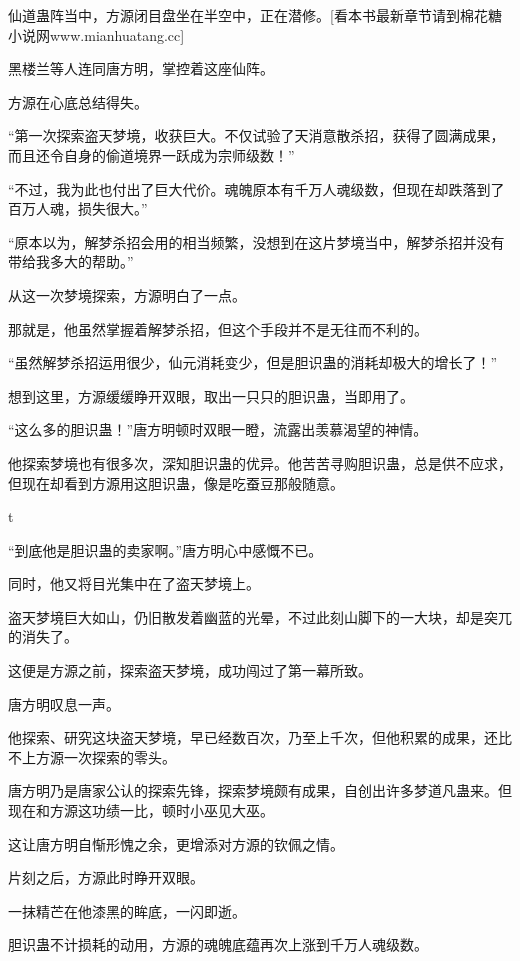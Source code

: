 
\begin{this_body}

仙道蛊阵当中，方源闭目盘坐在半空中，正在潜修。[看本书最新章节请到棉花糖小说网www.mianhuatang.cc]

黑楼兰等人连同唐方明，掌控着这座仙阵。

方源在心底总结得失。

“第一次探索盗天梦境，收获巨大。不仅试验了天消意散杀招，获得了圆满成果，而且还令自身的偷道境界一跃成为宗师级数！”

“不过，我为此也付出了巨大代价。魂魄原本有千万人魂级数，但现在却跌落到了百万人魂，损失很大。”

“原本以为，解梦杀招会用的相当频繁，没想到在这片梦境当中，解梦杀招并没有带给我多大的帮助。”

从这一次梦境探索，方源明白了一点。

那就是，他虽然掌握着解梦杀招，但这个手段并不是无往而不利的。

“虽然解梦杀招运用很少，仙元消耗变少，但是胆识蛊的消耗却极大的增长了！”

想到这里，方源缓缓睁开双眼，取出一只只的胆识蛊，当即用了。

“这么多的胆识蛊！”唐方明顿时双眼一瞪，流露出羡慕渴望的神情。

他探索梦境也有很多次，深知胆识蛊的优异。他苦苦寻购胆识蛊，总是供不应求，但现在却看到方源用这胆识蛊，像是吃蚕豆那般随意。

t

“到底他是胆识蛊的卖家啊。”唐方明心中感慨不已。

同时，他又将目光集中在了盗天梦境上。

盗天梦境巨大如山，仍旧散发着幽蓝的光晕，不过此刻山脚下的一大块，却是突兀的消失了。

这便是方源之前，探索盗天梦境，成功闯过了第一幕所致。

唐方明叹息一声。

他探索、研究这块盗天梦境，早已经数百次，乃至上千次，但他积累的成果，还比不上方源一次探索的零头。

唐方明乃是唐家公认的探索先锋，探索梦境颇有成果，自创出许多梦道凡蛊来。但现在和方源这功绩一比，顿时小巫见大巫。

这让唐方明自惭形愧之余，更增添对方源的钦佩之情。

片刻之后，方源此时睁开双眼。

一抹精芒在他漆黑的眸底，一闪即逝。

胆识蛊不计损耗的动用，方源的魂魄底蕴再次上涨到千万人魂级数。


\end{this_body}
